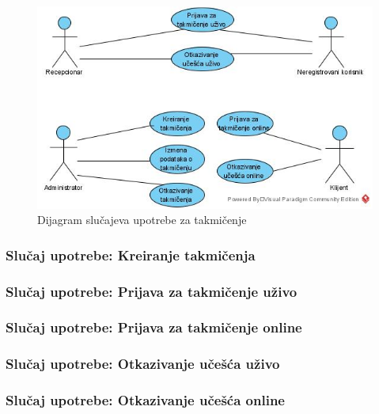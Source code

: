 \documentclass[a4paper]{article}
\begin{document}
\begin{figure}[!ht]
\begin{center}
\includegraphics[scale=0.55]{sections/images/dijagram_slucajeva_upotrebe_za_takmicenje.jpg}
\end{center}
\caption{Dijagram slučajeva upotrebe za takmičenje}
\label{fig:kontekst}
\end{figure}

\subsubsection{Slučaj upotrebe: Kreiranje takmičenja}


\subsubsection{Slučaj upotrebe: Prijava za takmičenje uživo}


\subsubsection{Slučaj upotrebe: Prijava za takmičenje online}


\subsubsection{Slučaj upotrebe: Otkazivanje učešća uživo}


\subsubsection{Slučaj upotrebe: Otkazivanje učešća online}

\end{document}
